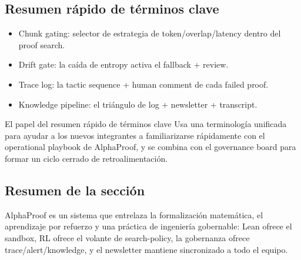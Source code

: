 \subsection{Resumen rápido de términos clave}
\begin{itemize}
    \item Chunk gating: selector de estrategia de token/overlap/latency dentro del proof search.
    \item Drift gate: la caída de entropy activa el fallback + review.
    \item Trace log: la tactic sequence + human comment de cada failed proof.
    \item Knowledge pipeline: el triángulo de log + newsletter + transcript.
\end{itemize}
\begin{knowledgebox}{El papel del resumen rápido de términos clave}
Usa una terminología unificada para ayudar a los nuevos integrantes a familiarizarse rápidamente con el operational playbook de AlphaProof, y se combina con el governance board para formar un ciclo cerrado de retroalimentación.
\end{knowledgebox}

\subsection{Resumen de la sección}
AlphaProof es un sistema que entrelaza la formalización matemática, el aprendizaje por refuerzo y una práctica de ingeniería gobernable: Lean ofrece el sandbox, RL ofrece el volante de search-policy, la gobernanza ofrece trace/alert/knowledge, y el newsletter mantiene sincronizado a todo el equipo.



